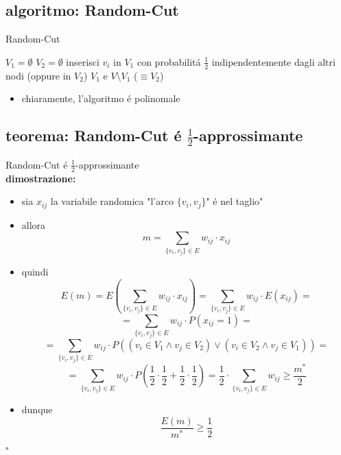 
\newpage
\subsection*{algoritmo: Random-Cut}
\begin{flushleft}
	\begin{algorithm}
		\caption{Random-Cut}
		\begin{algorithmic}
			\STATE $V_1=\emptyset$
			\STATE $V_2=\emptyset$
				\STATE inserisci $v_i$ in $V_1$ con probabilit\'a $\frac{1}{2}$ indipendentemente dagli altri nodi (oppure in $V_2$)
			\ENDFOR
			\RETURN $V_1$ e $V\setminus V_1$ ($\equiv V_2$)
		\end{algorithmic}
	\end{algorithm}
	\begin{itemize}
		\item chiaramente, l'algoritmo \'e polinomale
	\end{itemize}
\end{flushleft}


\subsection*{teorema: Random-Cut \'e $\frac{1}{2}$-approssimante}
\begin{flushleft}
	Random-Cut \'e $\frac{1}{2}$-approssimante \newline \\
	\textbf{dimostrazione:}
	\begin{itemize}
		\item sia $x_{ij}$ la variabile randomica "l'arco $\{v_i,v_j\}$" \'e nel taglio"
		\item allora
			$$m=\sum_{\{v_i,v_j\}\in E}w_{ij}\cdot x_{ij}$$
		\item quindi
			$$E(m)=E(\sum_{\{v_i,v_j\}\in E}w_{ij}\cdot x_{ij})=\sum_{\{v_i,v_j\}\in E}w_{ij}\cdot E(x_{ij})=$$
			$$=\sum_{\{v_i,v_j\}\in E}w_{ij}\cdot P(x_{ij}=1)=$$
			$$=\sum_{\{v_i,v_j\}\in E}w_{ij}\cdot P((v_i\in V_1\land v_j\in V_2)\lor(v_i\in V_2\land v_j\in V_1))=$$
			$$=\sum_{\{v_i,v_j\}\in E}w_{ij}\cdot P(\frac{1}{2}\cdot\frac{1}{2}+\frac{1}{2}\cdot\frac{1}{2})=\frac{1}{2}\cdot\sum_{\{v_i,v_j\}\in E}w_{ij}\geq\frac{m^*}{2}$$
		\item dunque
			$$\frac{E(m)}{m^*}\geq\frac{1}{2}$$
	\end{itemize}
	\hfill$\square$
\end{flushleft}

